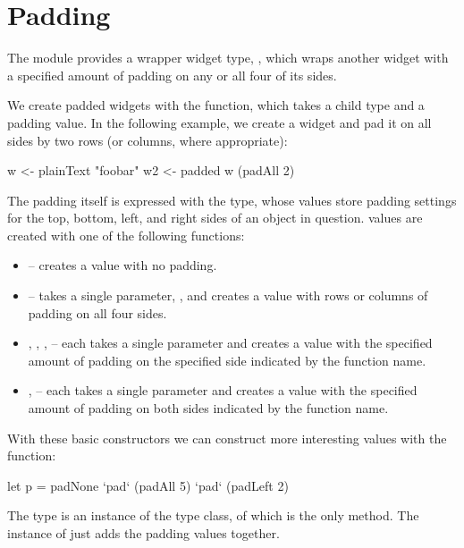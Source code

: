 \section{Padding}
\label{sec:padding}

The  module provides a wrapper widget type, ,
which wraps another widget with a specified amount of padding on any
or all four of its sides.

We create padded widgets with the  function, which takes a
child type  and a padding value.  In the following
example, we create a  widget and pad it on all sides
by two rows (or columns, where appropriate):

\begin{haskellcode}
 w <- plainText "foobar"
 w2 <- padded w (padAll 2)
\end{haskellcode}

The padding itself is expressed with the  type, whose
values store padding settings for the top, bottom, left, and right
sides of an object in question.   values are created with
one of the following functions:

\begin{itemize}
\item {} -- creates a  value with no padding.
\item {} -- takes a single parameter, , and creates a
   value with  rows or columns of padding on all
  four sides.
\item {}, , ,  -- each
  takes a single parameter and creates a  value with the
  specified amount of padding on the specified side indicated by the
  function name.
\item {},  -- each takes a single
  parameter and creates a  value with the specified amount
  of padding on both sides indicated by the function name.
\end{itemize}

With these basic  constructors we can construct more
interesting  values with the  function:

\begin{haskellcode}
 let p = padNone `pad` (padAll 5) `pad` (padLeft 2)
\end{haskellcode}

The  type is an instance of the  type class,
of which  is the only method.  The  instance of
 just adds the padding values together.

